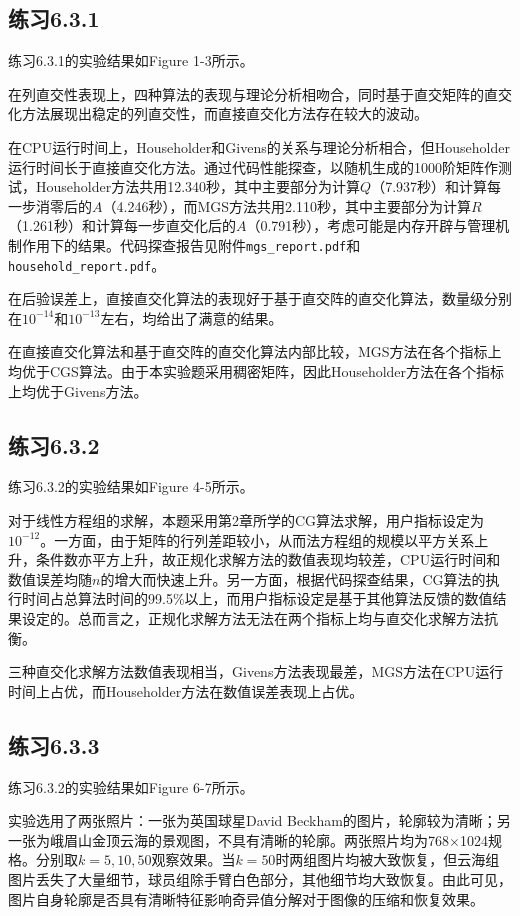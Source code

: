 \documentclass[UTF8,a4paper,10pt]{ctexart}
\begin{document}
    \subsection{练习6.3.1}
        \par
        练习6.3.1的实验结果如Figure 1-3所示。
        \par
        在列直交性表现上，四种算法的表现与理论分析相吻合，同时基于直交矩阵的直交化方法展现出稳定的列直交性，而直接直交化方法存在较大的波动。
        \par
        在CPU运行时间上，Householder和Givens的关系与理论分析相合，但Householder运行时间长于直接直交化方法。通过代码性能探查，以随机生成的1000阶矩阵作测试，Householder方法共用12.340秒，其中主要部分为计算$Q$（7.937秒）和计算每一步消零后的$A$（4.246秒），而MGS方法共用2.110秒，其中主要部分为计算$R$（1.261秒）和计算每一步直交化后的$A$（0.791秒），考虑可能是内存开辟与管理机制作用下的结果。代码探查报告见附件\texttt{mgs\_report.pdf}和\texttt{household\_report.pdf}。
        \par
        在后验误差上，直接直交化算法的表现好于基于直交阵的直交化算法，数量级分别在$10^{-14}$和$10^{-13}$左右，均给出了满意的结果。
        \par
        在直接直交化算法和基于直交阵的直交化算法内部比较，MGS方法在各个指标上均优于CGS算法。由于本实验题采用稠密矩阵，因此Householder方法在各个指标上均优于Givens方法。
    \subsection{练习6.3.2}
        \par
        练习6.3.2的实验结果如Figure 4-5所示。
        \par
        对于线性方程组的求解，本题采用第2章所学的CG算法求解，用户指标设定为$10^{-12}$。一方面，由于矩阵的行列差距较小，从而法方程组的规模以平方关系上升，条件数亦平方上升，故正规化求解方法的数值表现均较差，CPU运行时间和数值误差均随$n$的增大而快速上升。另一方面，根据代码探查结果，CG算法的执行时间占总算法时间的99.5\%以上，而用户指标设定是基于其他算法反馈的数值结果设定的。总而言之，正规化求解方法无法在两个指标上均与直交化求解方法抗衡。
        \par
        三种直交化求解方法数值表现相当，Givens方法表现最差，MGS方法在CPU运行时间上占优，而Householder方法在数值误差表现上占优。
    \subsection{练习6.3.3}
        \par
        练习6.3.2的实验结果如Figure 6-7所示。
        \par
        实验选用了两张照片：一张为英国球星David Beckham的图片，轮廓较为清晰；另一张为峨眉山金顶云海的景观图，不具有清晰的轮廓。两张照片均为768$\times$1024规格。分别取$k=5,10,50$观察效果。当$k=50$时两组图片均被大致恢复，但云海组图片丢失了大量细节，球员组除手臂白色部分，其他细节均大致恢复。由此可见，图片自身轮廓是否具有清晰特征影响奇异值分解对于图像的压缩和恢复效果。
\end{document}
